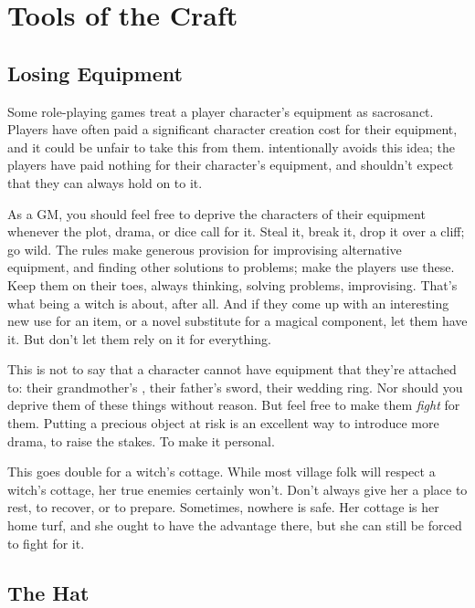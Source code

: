 \chapter{Tools of the Craft}

\section{Losing Equipment}

Some role-playing games treat a player character's equipment as sacrosanct.
Players have often paid a significant character creation cost for their equipment, and it could be unfair to take this from them.
 intentionally avoids this idea; the players have paid nothing for their character's equipment, and shouldn't expect that they can always hold on to it.

As a GM, you should feel free to deprive the characters of their equipment whenever the plot, drama, or dice call for it.
Steal it, break it, drop it over a cliff; go wild.
The rules make generous provision for improvising alternative equipment, and finding other solutions to problems; make the players use these.
Keep them on their toes, always thinking, solving problems, improvising.
That's what being a witch is about, after all.
And if they come up with an interesting new use for an item, or a novel substitute for a magical component, let them have it.
But don't let them rely on it for everything.


This is not to say that a character cannot have equipment that they're attached to: their grandmother's , their father's sword, their wedding ring.
Nor should you deprive them of these things without reason.
But feel free to make them \emph{fight} for them.
Putting a precious object at risk is an excellent way to introduce more drama, to raise the stakes.
To make it personal.

This goes double for a witch's cottage.
While most village folk will respect a witch's cottage, her true enemies certainly won't.
Don't always give her a place to rest, to recover, or to prepare.
Sometimes, nowhere is safe.
Her cottage is her home turf, and she ought to have the advantage there, but she can still be forced to fight for it.



\section{The Hat}

